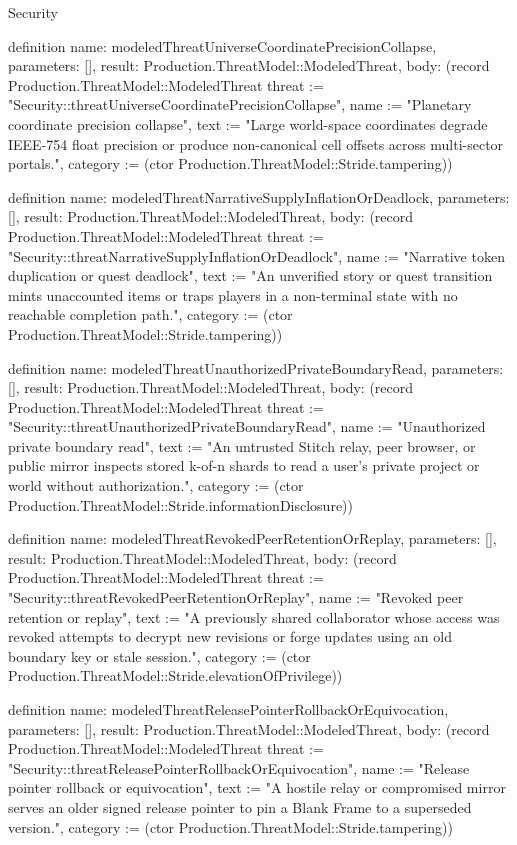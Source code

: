 \begin{lexlean}{Security}
\begin{semanticmodule}
definition{
  name: modeledThreatUniverseCoordinatePrecisionCollapse,
  parameters: [],
  result: Production.ThreatModel::ModeledThreat,
  body: (record Production.ThreatModel::ModeledThreat {threat := "Security::threatUniverseCoordinatePrecisionCollapse", name := "Planetary coordinate precision collapse", text := "Large world-space coordinates degrade IEEE-754 float precision or produce non-canonical cell offsets across multi-sector portals.", category := (ctor Production.ThreatModel::Stride.tampering)})
}

definition{
  name: modeledThreatNarrativeSupplyInflationOrDeadlock,
  parameters: [],
  result: Production.ThreatModel::ModeledThreat,
  body: (record Production.ThreatModel::ModeledThreat {threat := "Security::threatNarrativeSupplyInflationOrDeadlock", name := "Narrative token duplication or quest deadlock", text := "An unverified story or quest transition mints unaccounted items or traps players in a non-terminal state with no reachable completion path.", category := (ctor Production.ThreatModel::Stride.tampering)})
}

definition{
  name: modeledThreatUnauthorizedPrivateBoundaryRead,
  parameters: [],
  result: Production.ThreatModel::ModeledThreat,
  body: (record Production.ThreatModel::ModeledThreat {threat := "Security::threatUnauthorizedPrivateBoundaryRead", name := "Unauthorized private boundary read", text := "An untrusted Stitch relay, peer browser, or public mirror inspects stored k-of-n shards to read a user's private project or world without authorization.", category := (ctor Production.ThreatModel::Stride.informationDisclosure)})
}

definition{
  name: modeledThreatRevokedPeerRetentionOrReplay,
  parameters: [],
  result: Production.ThreatModel::ModeledThreat,
  body: (record Production.ThreatModel::ModeledThreat {threat := "Security::threatRevokedPeerRetentionOrReplay", name := "Revoked peer retention or replay", text := "A previously shared collaborator whose access was revoked attempts to decrypt new revisions or forge updates using an old boundary key or stale session.", category := (ctor Production.ThreatModel::Stride.elevationOfPrivilege)})
}

definition{
  name: modeledThreatReleasePointerRollbackOrEquivocation,
  parameters: [],
  result: Production.ThreatModel::ModeledThreat,
  body: (record Production.ThreatModel::ModeledThreat {threat := "Security::threatReleasePointerRollbackOrEquivocation", name := "Release pointer rollback or equivocation", text := "A hostile relay or compromised mirror serves an older signed release pointer to pin a Blank Frame to a superseded version.", category := (ctor Production.ThreatModel::Stride.tampering)})
}


\end{semanticmodule}
\end{lexlean}
